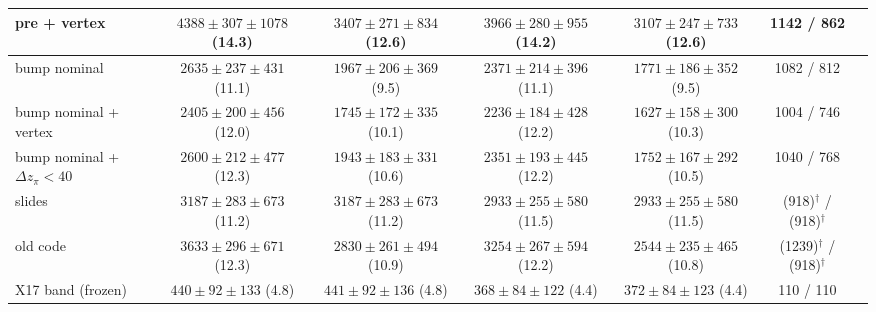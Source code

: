 \begin{table}[H]
{\begin{tabular}{lcccccc}
pre + vertex & $4388\pm307\pm1078$ (14.3) & $3407\pm271\pm834$ (12.6) & $3966\pm280\pm955$ (14.2) & $3107\pm247\pm733$ (12.6) & 1142 / 862 \\
\midrule
bump nominal & $2635\pm237\pm431$ (11.1) & $1967\pm206\pm369$ (9.5) & $2371\pm214\pm396$ (11.1) & $1771\pm186\pm352$ (9.5) & 1082 / 812 \\
bump nominal + vertex & $2405\pm200\pm456$ (12.0) & $1745\pm172\pm335$ (10.1) & $2236\pm184\pm428$ (12.2) & $1627\pm158\pm300$ (10.3) & 1004 / 746 \\
bump nominal + $\Delta z_\pi<40$ & $2600\pm212\pm477$ (12.3) & $1943\pm183\pm331$ (10.6) & $2351\pm193\pm445$ (12.2) & $1752\pm167\pm292$ (10.5) & 1040 / 768 \\
\midrule
slides & $3187\pm283\pm673$ (11.2) & $3187\pm283\pm673$ (11.2) & $2933\pm255\pm580$ (11.5) & $2933\pm255\pm580$ (11.5) & (918)$^\dagger$ / (918)$^\dagger$ \\
old code & $3633\pm296\pm671$ (12.3) & $2830\pm261\pm494$ (10.9) & $3254\pm267\pm594$ (12.2) & $2544\pm235\pm465$ (10.8) & (1239)$^\dagger$ / (918)$^\dagger$ \\
\midrule
X17 band (frozen) & $440\pm92\pm133$ (4.8) & $441\pm92\pm136$ (4.8) & $368\pm84\pm122$ (4.4) & $372\pm84\pm123$ (4.4) & 110 / 110 \\
\bottomrule
\end{tabular}}
\end{table}
